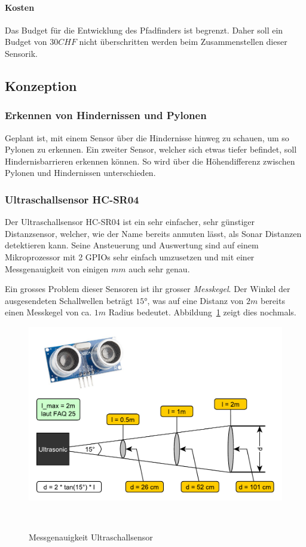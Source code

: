 \documentclass[main.tex]{subfiles} %
\begin{document}
\paragraph{Kosten}
Das Budget für die Entwicklung des Pfadfinders ist begrenzt. Daher soll ein
Budget von $30 CHF$ nicht überschritten werden beim Zusammenstellen dieser
Sensorik.

\subsection*{Konzeption}

\subsubsection*{Erkennen von Hindernissen und Pylonen}
Geplant ist, mit einem Sensor über die Hindernisse hinweg zu schauen, um so
Pylonen zu erkennen. Ein zweiter Sensor, welcher sich etwas tiefer befindet,
soll Hindernisbarrieren erkennen können. So wird über die Höhendifferenz
zwischen Pylonen und Hindernissen unterschieden.

\subsubsection*{Ultraschallsensor HC-SR04}
Der Ultraschallsensor HC-SR04 ist ein sehr einfacher, sehr günstiger Distanzsensor, welcher,
wie der Name bereits anmuten lässt, als Sonar Distanzen detektieren kann.
Seine Ansteuerung und Auswertung sind auf einem Mikroprozessor mit 2 GPIOs
sehr einfach umzusetzen und mit einer Messgenauigkeit von einigen $mm$ auch sehr genau.

Ein grosses Problem dieser Sensoren ist ihr grosser \textit{Messkegel}. Der
Winkel der ausgesendeten Schallwellen beträgt $15°$, was auf eine Distanz von
$2m$ bereits einen Messkegel von ca. $1 m$ Radius bedeutet.
Abbildung~\ref{fig:Genauigkeit_Ultraschallsensor} zeigt dies nochmals.

\begin{figure}[h!]
    \centering
    \includegraphics[width=0.75\linewidth]{./fig_Hinderniserkennung/Auslesegenauigkeit_Ultraschall.pdf}
    \caption{Messgenauigkeit Ultraschallsensor}~\label{fig:Genauigkeit_Ultraschallsensor}
\end{figure}
\end{document}
